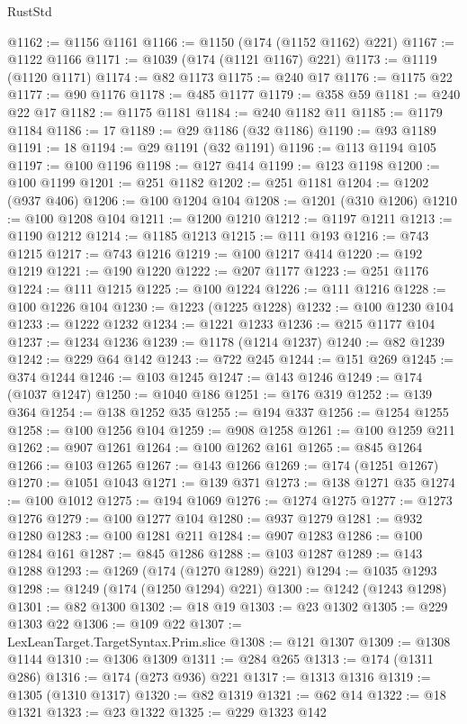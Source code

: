 \begin{lexlean}{RustStd}
\begin{coremodule}
{\begin{coremodule}
{{{{{{{{{{{{{{{{{{{{{{{{{{{{{{{{{{{{{{{{{{{{{{{{{{{{{{{@1162 := @1156 @1161
@1166 := @1150 (@174 (@1152 @1162) @221)
@1167 := @1122 @1166
@1171 := @1039 (@174 (@1121 @1167) @221)
@1173 := @1119 (@1120 @1171)
@1174 := @82 @1173
@1175 := @240 @17
@1176 := @1175 @22
@1177 := @90 @1176
@1178 := @485 @1177
@1179 := @358 @59
@1181 := @240 @22 @17
@1182 := @1175 @1181
@1184 := @240 @1182 @11
@1185 := @1179 @1184
@1186 := 17
@1189 := @29 @1186 (@32 @1186)
@1190 := @93 @1189
@1191 := 18
@1194 := @29 @1191 (@32 @1191)
@1196 := @113 @1194 @105
@1197 := @100 @1196
@1198 := @127 @414
@1199 := @123 @1198
@1200 := @100 @1199
@1201 := @251 @1182
@1202 := @251 @1181
@1204 := @1202 (@937 @406)
@1206 := @100 @1204 @104
@1208 := @1201 (@310 @1206)
@1210 := @100 @1208 @104
@1211 := @1200 @1210
@1212 := @1197 @1211
@1213 := @1190 @1212
@1214 := @1185 @1213
@1215 := @111 @193
@1216 := @743 @1215
@1217 := @743 @1216
@1219 := @100 @1217 @414
@1220 := @192 @1219
@1221 := @190 @1220
@1222 := @207 @1177
@1223 := @251 @1176
@1224 := @111 @1215
@1225 := @100 @1224
@1226 := @111 @1216
@1228 := @100 @1226 @104
@1230 := @1223 (@1225 @1228)
@1232 := @100 @1230 @104
@1233 := @1222 @1232
@1234 := @1221 @1233
@1236 := @215 @1177 @104
@1237 := @1234 @1236
@1239 := @1178 (@1214 @1237)
@1240 := @82 @1239
@1242 := @229 @64 @142
@1243 := @722 @245
@1244 := @151 @269
@1245 := @374 @1244
@1246 := @103 @1245
@1247 := @143 @1246
@1249 := @174 (@1037 @1247)
@1250 := @1040 @186
@1251 := @176 @319
@1252 := @139 @364
@1254 := @138 @1252 @35
@1255 := @194 @337
@1256 := @1254 @1255
@1258 := @100 @1256 @104
@1259 := @908 @1258
@1261 := @100 @1259 @211
@1262 := @907 @1261
@1264 := @100 @1262 @161
@1265 := @845 @1264
@1266 := @103 @1265
@1267 := @143 @1266
@1269 := @174 (@1251 @1267)
@1270 := @1051 @1043
@1271 := @139 @371
@1273 := @138 @1271 @35
@1274 := @100 @1012
@1275 := @194 @1069
@1276 := @1274 @1275
@1277 := @1273 @1276
@1279 := @100 @1277 @104
@1280 := @937 @1279
@1281 := @932 @1280
@1283 := @100 @1281 @211
@1284 := @907 @1283
@1286 := @100 @1284 @161
@1287 := @845 @1286
@1288 := @103 @1287
@1289 := @143 @1288
@1293 := @1269 (@174 (@1270 @1289) @221)
@1294 := @1035 @1293
@1298 := @1249 (@174 (@1250 @1294) @221)
@1300 := @1242 (@1243 @1298)
@1301 := @82 @1300
@1302 := @18 @19
@1303 := @23 @1302
@1305 := @229 @1303 @22
@1306 := @109 @22
@1307 := LexLeanTarget.TargetSyntax.Prim.slice
@1308 := @121 @1307
@1309 := @1308 @1144
@1310 := @1306 @1309
@1311 := @284 @265
@1313 := @174 (@1311 @286)
@1316 := @174 (@273 @936) @221
@1317 := @1313 @1316
@1319 := @1305 (@1310 @1317)
@1320 := @82 @1319
@1321 := @62 @14
@1322 := @18 @1321
@1323 := @23 @1322
@1325 := @229 @1323 @142
}}}}}}}}}}}}}}}}}}}}}}}}}}}}}}}}}}}}}}}}}}}}}}}}}}}}}}}
\end{coremodule}}
\end{coremodule}
\end{lexlean}
